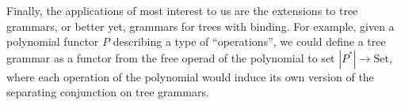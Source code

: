 \documentclass[12pt]{article}
\newcommand{\Set}{\textrm{Set}}
\begin{document}
Finally, the applications of most interest to us are the extensions to
tree grammars, or better yet, grammars for trees with binding. For
example, given a polynomial functor $P$ describing a type of
``operations'', we could define a tree grammar as a functor from the
free operad of the polynomial to set $|P^*| \to \Set$, where each
operation of the polynomial would induce its own version of the
separating conjunction on tree grammars.



\end{document}
